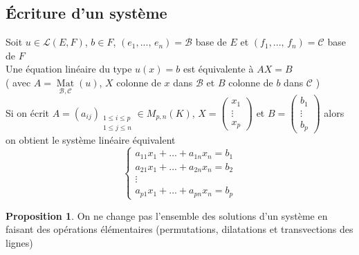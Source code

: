 \documentclass[10pt,a4paper]{article}
\theoremstyle{definition}
\newtheorem{proposition}{Proposition}[section]
\DeclareMathOperator*{\mat}{Mat}
\begin{document}
\subsection{Écriture d'un système}
\noindent Soit $u \in \mathcal{L}(E, F)$, $b \in F$, $(e_1, ...,\, e_n) = \mathcal{B}$ base de $E$ et $(f_1, ...,\, f_n) = \mathcal{C}$ base de $F$ \\
Une équation linéaire du type $u(x) = b$ est équivalente à $AX = B$ \\
( avec $A = \mat\limits_{\mathcal{B}, \mathcal{C}}(u)$, $X$ colonne de $x$ dans $\mathcal{B}$ et $B$ colonne de $b$ dans $\mathcal{C}$ ) \\
Si on écrit $A = (a_{ij})_{\substack{1 \leq i \leq p \\ 1 \leq j \leq n}} \in M_{p, n}(K)$, $X = \begin{pmatrix}
x_1 \\
\vdots \\
x_p
\end{pmatrix}$ et $B = \begin{pmatrix}
b_1 \\
\vdots \\
b_p
\end{pmatrix}$ alors on obtient le système linéaire équivalent
\[ \begin{cases}
a_{11} x_1 + ... + a_{1n}x_n = b_1 \\
a_{21} x_1 + ... + a_ {2n}x_n = b_2 \\
\vdots \\
a_{p1} x_1 + ... + a_{pn}x_n = b_p
\end{cases} \]
\begin{proposition}
On ne change pas l'ensemble des solutions d'un système en faisant des opérations élémentaires (permutations, dilatations et transvections des lignes)
\end{proposition}
\end{document}
